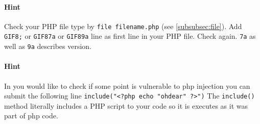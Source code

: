 \documentclass{article}[12pt]
\newcommand{\q}[1]{\texttt{#1}}
\begin{document}
\paragraph{Hint} Check your PHP file type by \texttt{file filename.php} (see \ref{subsubsec:file}). Add \texttt{GIF8;} or \q{GIF87a} or \q{GIF89a} line as first line in your PHP file.
Check again.
\q{7a} as well as \q{9a} describes version.

\paragraph{Hint} In you would like to check if some point is vulnerable to php injection you can submit the following line \q{include("<?php echo "ohdear" ?>")}
The \q{include()} method literally includes a PHP script to your code so it is executes as it was part of php code.
\end{document}
